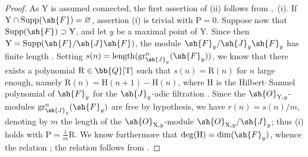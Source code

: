 \begin{proof}
As $\mathrm{Y}$ is assumed connected, the first assertion of (ii) follows from ,~(i). If $\mathrm{Y}\cap\operatorname{Supp}(\sh{F})=\varnothing$, assertion (i) is trivial with $\mathrm{P}=0$. Suppose now that $\operatorname{Supp}(\sh{F})\supset\mathrm{Y}$, and let $y$ be a maximal point of $\mathrm{Y}$. Since then $\mathrm{Y}=\operatorname{Supp}(\sh{F}/\sh{J}\sh{F})$, the module $\sh{F}_y/\sh{J}_y\sh{F}_y$ has finite length . Setting $s(n)=\operatorname{length}(\operatorname{gr}^n_{\sh{J}_y}(\sh{F}_y))$, we know that there exists a polynomial $\mathrm{R}\in\bb{Q}[\mathrm{T}]$ such that $s(n)=\mathrm{R}(n)$ for $n$ large enough, namely $\mathrm{R}(n)=\mathrm{H}(n+1)-\mathrm{H}(n)$, where $\mathrm{H}$ is the Hilbert--Samuel polynomial of $\sh{F}_y$ for the $\sh{J}_y$-adic filtration . Since the $\sh{O}_{\mathrm{Y},y}$-modules $\operatorname{gr}^n_{\sh{J}_y}(\sh{F}_y)$ are free by hypothesis, we have $r(n)=s(n)/m$, denoting by $m$ the length of the $\sh{O}_{\mathrm{X},y}$-module $\sh{O}_{\mathrm{X},y}/\sh{J}_y$; thus (i) holds with $\mathrm{P}=\frac{1}{m}\mathrm{R}$. We know furthermore  that $\deg(\mathrm{H})=\dim(\sh{F}_y)$, whence the relation ; the relation  follows from .


\end{proof}

